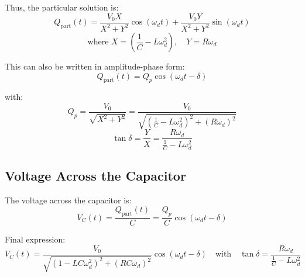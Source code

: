 \documentclass{article}
\begin{document}
Thus, the particular solution is:
\[
Q_{\text{part}}(t) = \frac{V_0 X}{X^2 + Y^2} \cos(\omega_d t) + \frac{V_0 Y}{X^2 + Y^2} \sin(\omega_d t)
\]
\[
\text{where } X = \left( \frac{1}{C} - L \omega_d^2 \right), \quad Y = R \omega_d
\]

This can also be written in amplitude-phase form:
\[
Q_{\text{part}}(t) = Q_p \cos(\omega_d t - \delta)
\]

with:
\[
Q_p = \frac{V_0}{\sqrt{X^2 + Y^2}} = \frac{V_0}{\sqrt{\left( \frac{1}{C} - L \omega_d^2 \right)^2 + (R \omega_d)^2}}
\]
\[
\tan \delta = \frac{Y}{X} = \frac{R \omega_d}{\frac{1}{C} - L \omega_d^2}
\]

\subsection*{Voltage Across the Capacitor}

The voltage across the capacitor is:
\[
V_C(t) = \frac{Q_{\text{part}}(t)}{C} = \frac{Q_p}{C} \cos(\omega_d t - \delta)
\]

Final expression:
\[
\boxed{
V_C(t) = \frac{V_0}{\sqrt{(1 - L C \omega_d^2)^2 + (R C \omega_d)^2}} \cos(\omega_d t - \delta)
}
\quad \text{with} \quad
\tan \delta = \frac{R \omega_d}{\frac{1}{C} - L \omega_d^2}
\]
\end{document}
